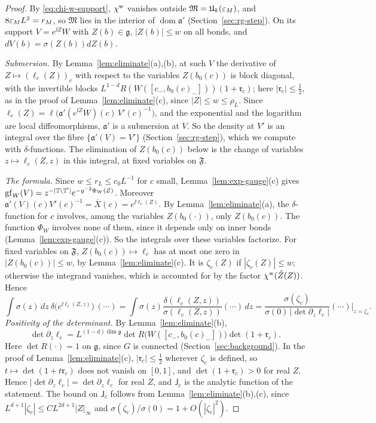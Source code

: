 \begin{proof}
By \eqref{eq:chi-w-support}, $\chi^{\rm w}$ vanishes outside $\mathfrak M=\mathfrak U_k(\varepsilon_M)$, and $8\varepsilon_ML^2=r_M$, so $\mathfrak M$ lies in the interior of $\operatorname{dom}\mathfrak a'$ (Section~\ref{sec:rg-step}). On its support $V=e^{\ii Z}W$ with $Z(b)\in\mathfrak g$, $|Z(b)|\le w$ on all bonds, and $dV(b)=\sigma(Z(b))dZ(b)$.

\emph{Submersion.} By Lemma~\ref{lem:eliminate}(a),(b), at such $V$ the derivative of $Z\mapsto(\ell_c(Z))_c$ with respect to the variables $Z(b_0(c))$ is block diagonal, with the invertible blocks $L^{1-d}R(W([c_-,b_0(c)_-]))(1+\mathfrak r_c)$; here $|\mathfrak r_c|\le\frac12$, as in the proof of Lemma~\ref{lem:eliminate}(c), since $|Z|\le w\le\rho_L$. Since $\ell_c(Z)=\ell\big(\mathfrak a'(e^{\ii Z}W)(c)\,V'(c)^{-1}\big)$, and the exponential and the logarithm are local diffeomorphisms, $\mathfrak a'$ is a submersion at $V$. So the density at $V'$ is an integral over the fibre $\{\mathfrak a'(V)=V'\}$ (Section~\ref{sec:rg-step}), which we compute with $\delta$-functions. The elimination of $Z(b_0(c))$ below is the change of variables $z\mapsto\ell_c(Z,z)$ in this integral, at fixed variables on $\mathfrak F$.

\emph{The formula.} Since $w\le r_L\le c_0L^{-1}$ for $c$ small, Lemma~\ref{lem:exp-gauge}(c) gives $\mathrm{gf}_W(V)=z^{-|\mathbb T\setminus\mathbb T'|}e^{-g^{-2}\Phi_W(Z)}$. Moreover $\mathfrak a'(V)(c)V'(c)^{-1}=\overline X(c)=e^{\ii\ell_c(Z)}$. By Lemma~\ref{lem:eliminate}(a), the $\delta$-function for $c$ involves, among the variables $Z(b_0(\cdot))$, only $Z(b_0(c))$. The function $\Phi_W$ involves none of them, since it depends only on inner bonds (Lemma~\ref{lem:exp-gauge}(c)). So the integrals over these variables factorize. For fixed variables on $\mathfrak F$, $Z(b_0(c))\mapsto\ell_c$ has at most one zero in $|Z(b_0(c))|\le w$, by Lemma~\ref{lem:eliminate}(c). It is $\zeta_c(Z)$ if $|\zeta_c(Z)|\le w$; otherwise the integrand vanishes, which is accounted for by the factor $\chi^{\rm w}(\hat Z(Z))$. Hence
\[
\int\sigma(z)\,dz\ \delta\big(e^{\ii\ell_c(Z,z)}\big)\,(\cdots)=\int\sigma(z)\frac{\delta(\ell_c(Z,z))}{\sigma(\ell_c(Z,z))}(\cdots)\,dz=\frac{\sigma(\zeta_c)}{\sigma(0)\,|\det\partial_z\ell_c|}(\cdots)\Big|_{z=\zeta_c} .
\]
\emph{Positivity of the determinant.} By Lemma~\ref{lem:eliminate}(b),
\[
\det\partial_z\ell_c=L^{(1-d)\dim\mathfrak g}\det R\big(W([c_-,b_0(c)_-])\big)\det(1+\mathfrak r_c).
\]
Here $\det R(\cdot)=1$ on $\mathfrak g$, since $G$ is connected (Section~\ref{sec:background}). In the proof of Lemma~\ref{lem:eliminate}(c), $|\mathfrak r_c|\le\frac12$ wherever $\zeta_c$ is defined, so $t\mapsto\det(1+t\mathfrak r_c)$ does not vanish on $[0,1]$, and $\det(1+\mathfrak r_c)>0$ for real $Z$. Hence $|\det\partial_z\ell_c|=\det\partial_z\ell_c$ for real $Z$, and $\mathsf J_c$ is the analytic function of the statement. The bound on $\mathsf J_c$ follows from Lemma~\ref{lem:eliminate}(b),(c), since $L^{d+1}|\zeta_c|\le CL^{2d+1}|Z|_\infty$ and $\sigma(\zeta_c)/\sigma(0)=1+O(|\zeta_c|^2)$.
\end{proof}

